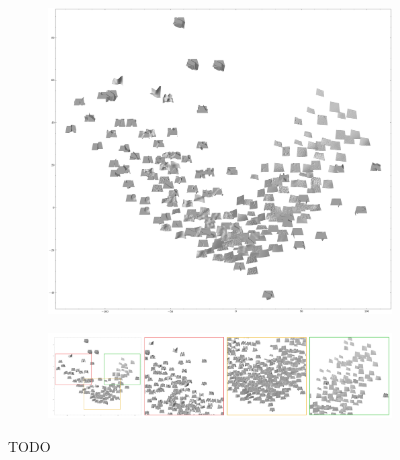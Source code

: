 \documentclass[../document.tex]{subfiles}
\begin{document}
\begin{figure}[H]
    \centering
    \begin{subfigure}[b]{1\textwidth}
        \includegraphics[width=\linewidth]{../img/5/pca/pca-patches-200.png}
    \end{subfigure}
    \begin{subfigure}[b]{1\textwidth}
        \includegraphics[width=\linewidth]{../img/5/pca/pca-train-patches-highlight.jpg}
    \end{subfigure}
\caption{TODO}
\end{figure}
\end{document}
